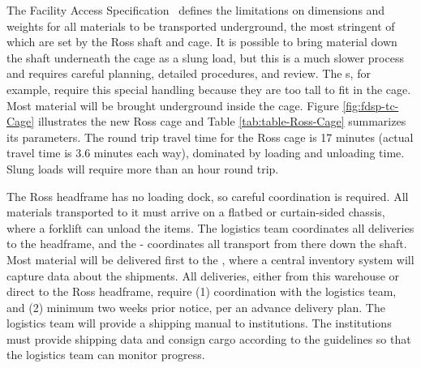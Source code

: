 The  Facility Access Specification~\cite{bib:docdb328} defines the limitations on dimensions and weights for all materials to be transported underground, the most stringent of which are set by the Ross shaft and cage. It is possible to bring material down the shaft underneath the cage as a slung load, but this is a much slower process and requires careful planning, detailed procedures, and review. The  s, for example, require this special handling because they are too tall to fit in the cage. Most material will be brought underground inside the cage. Figure \ref{fig:fdsp-tc-Cage} illustrates the new Ross cage and Table \ref{tab:table-Ross-Cage} summarizes its parameters.  The round trip travel time for the Ross cage is 17 minutes (actual travel time is \num{3.6} minutes each way), dominated by loading and unloading time.  Slung loads will require more than an hour round trip.


The Ross headframe has no loading dock, so careful coordination is required. All materials transported to it must arrive on a flatbed or curtain-sided chassis, where a forklift can unload  the items. The logistics team coordinates all deliveries to the headframe, and the - coordinates all transport from there down the shaft.  Most material will be delivered first to the , where a central inventory system will capture data about the shipments.  All deliveries, either from this warehouse or direct to the Ross headframe, require (1) coordination with the logistics team, and (2) minimum two weeks prior notice, per an advance delivery plan.  The logistics team will provide a shipping manual  to  institutions. The institutions must provide shipping data and consign cargo according to the guidelines so that the logistics team can monitor progress. 



